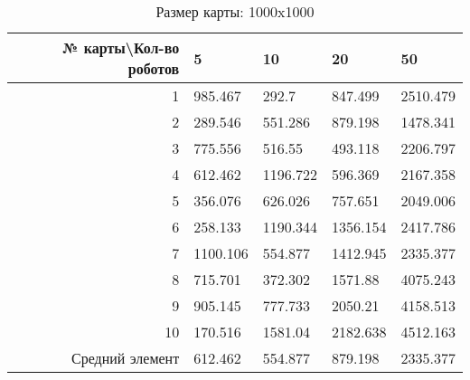 \begin{table}[H]
\centering
\begin{tabular}{|r|l|l|l|l|}
\hline
№ карты\textbackslash Кол-во роботов & \textbf{5} & \textbf{10} & \textbf{20} & \textbf{50}\\ \hline
1 & 985.467 & 292.7 & 847.499 & 2510.479\\ \hline
2 & 289.546 & 551.286 & 879.198 & 1478.341\\ \hline
3 & 775.556 & 516.55 & 493.118 & 2206.797\\ \hline
4 & 612.462 & 1196.722 & 596.369 & 2167.358\\ \hline
5 & 356.076 & 626.026 & 757.651 & 2049.006\\ \hline
6 & 258.133 & 1190.344 & 1356.154 & 2417.786\\ \hline
7 & 1100.106 & 554.877 & 1412.945 & 2335.377\\ \hline
8 & 715.701 & 372.302 & 1571.88 & 4075.243\\ \hline
9 & 905.145 & 777.733 & 2050.21 & 4158.513\\ \hline
10 & 170.516 & 1581.04 & 2182.638 & 4512.163\\ \hline
Средний элемент & 612.462 & 554.877 & 879.198 & 2335.377\\ \hline
\end{tabular}
\caption*{Размер карты: 1000x1000}
\end{table}
